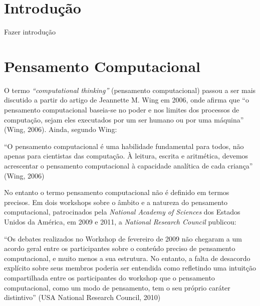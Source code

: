 \documentclass[12pt, openright, a4paper, brazil, openany, oneside]{abntex2}
\begin{document}


\frenchspacing 
\imprimircapa
\imprimirfolhaderosto*
\ABNTEXchapterfont
{}
\tableofcontents*
\cleardoublepage
\textual

\chapter*[Introdução]{Introdução}

Fazer introdução


\chapter{Pensamento Computacional}

O termo \textit{``computational thinking''} (pensamento computacional) passou a ser mais discutido a partir do artigo de Jeannette M. Wing em 2006, onde afirma que ``o pensamento computacional baseia-se no poder e nos limites dos processos de computação, sejam eles executados por um ser humano ou por uma máquina''\cite{wing} (Wing, 2006). Ainda, segundo Wing:

\begin{citacao}

``O pensamento computacional é uma habilidade fundamental para todos, não apenas para cientistas das computação. À leitura, escrita e aritmética, devemos acrescentar o pensamento computacional à capacidade analítica de cada criança'' (Wing, 2006)

\end{citacao}




No entanto o termo pensamento computacional não é definido em termos precisos. Em dois workshops sobre o âmbito e a natureza do pensamento computacional, patrocinados pela \textit{National Academy of Sciences} dos Estados Unidos da América, em 2009 e 2011, a \textit{National Research Council} publicou:

\begin{citacao}

``Os debates realizados no Workshop de fevereiro de 2009 não chegaram a um acordo geral entre os participantes sobre o conteúdo preciso de pensamento computacional, e muito menos a sua estrutura. No entanto, a falta de desacordo explícito sobre seus membros poderia ser entendida como refletindo uma intuitção compartilhada entre os participantes do workshop que o pensamento computacional, como um modo de pensamento, tem o seu próprio caráter distintivo'' \cite{NRC} (USA National Research Council, 2010)

\end{citacao}
\end{document}
